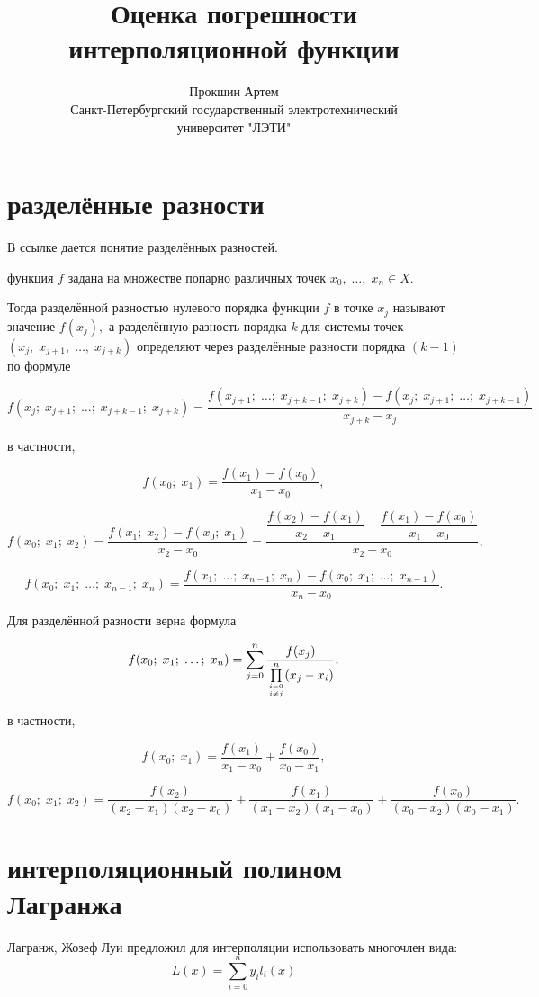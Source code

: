 \documentclass[a4paper,11pt]{article}
\author{ Прокшин Артем \\
Санкт-Петербургский государственный электротехнический\\университет "ЛЭТИ"}
\title{Оценка погрешности интерполяционной функции}
\date{}
\begin{document}
\maketitle
\section{разделённые разности}
В ссылке \cite{raznosty} дается понятие разделённых разностей.

функция $f$ задана на множестве попарно различных точек $x_0,\;\ldots,\;x_n \in X.$
 
Тогда
разделённой разностью нулевого порядка функции $f$ в точке $x_j$ называют значение $f(x_j) ,$ а разделённую разность порядка $k$ для системы точек $(x_j, \; x_{j+1}, \; \ldots, \; x_{j+k})$ определяют через разделённые разности порядка $(k-1)$ по формуле

$$
f(x_j; \; x_{j+1}; \; \ldots; \; x_{j+k-1}; \; x_{j+k}) = \frac{f(x_{j+1}; \; \ldots; \; x_{j+k-1}; \; x_{j+k}) - f(x_{j}; \; x_{j+1};\;\ldots;\;x_{j+k-1})}{x_{j+k}-x_{j}}
$$

в частности,

$$f(x_0;\;x_1)=\frac{f(x_1)-f(x_0)}{x_1-x_0} ,$$

$$f(x_0;\;x_1;\;x_2)=\frac{f(x_1;\;x_2)-f(x_0;\;x_1)}{x_2-x_0}=\dfrac{\dfrac{f(x_2)-f(x_1)}{x_2-x_1}-\dfrac{f(x_1)-f(x_0)}{x_1-x_0}}{x_2-x_0} ,$$

$$f(x_0;\;x_1;\;\ldots;\;x_{n-1};\;x_n) = \frac{f(x_1;\;\ldots;\;x_{n-1};\;x_n) - f(x_0;\;x_1;\;\ldots;\;x_{n-1})}{x_n-x_0} .$$

Для разделённой разности верна формула

$$f(x_0;\;x_1;\;\ldots;\;x_n)=\sum_{j=0}^n\dfrac{f(x_j)}{\prod\limits_{i=0\atop i\neq j}^n(x_j-x_i)},$$

в частности,

$$f(x_0;\;x_1)=\frac{f(x_1)}{x_1-x_0}+\frac{f(x_0)}{x_0-x_1} ,$$

$$f(x_0;\;x_1;\;x_2) = \frac{f(x_2)}{(x_2-x_1)(x_2-x_0)}+\frac{f(x_1)}{(x_1-x_2)(x_1-x_0)}+\frac{f(x_0)}{(x_0-x_2)(x_0-x_1)} .$$

\section{интерполяционный полином Лагранжа}
Лагранж, Жозеф Луи предложил для интерполяции использовать многочлен вида:
$$
L(x) = \sum_{i=0}^n y_i l_i(x)
$$
\end{document}
